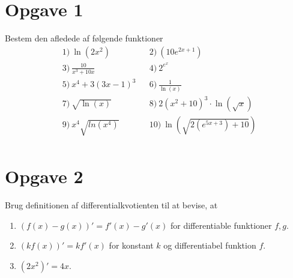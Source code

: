 \section*{Opgave 1}
Bestem den afledede af følgende funktioner
\begin{align*}
&1) \  \ln(2x^2)   &&2) \  (10e^{2x+1})   \\
&3) \  \frac{10}{x^3+10x}   &&4) \ 2^{e^x}    \\
&5) \  x^4+3(3x-1)^3   &&6) \  \frac{1}{\ln(x)}   \\
&7) \   \sqrt{\ln(x)}  &&8) \ 2(x^2+10)^3\cdot\ln(\sqrt{x})    \\
&9) \   x^4\sqrt{ln(x^4)}  &&10) \  \ln(\sqrt{2(e^{5x+3})+10})  \\
\end{align*}
\section*{Opgave 2}
Brug definitionen af differentialkvotienten til at bevise, at
\begin{enumerate}[label=\roman*)]
\item $(f(x)-g(x))' = f'(x)-g'(x)$ for differentiable funktioner $f,g$.
\item $(kf(x))' = kf'(x)$ for konstant $k$ og differentiabel funktion $f$.
\item $(2x^2)' = 4x$. 
\end{enumerate}
